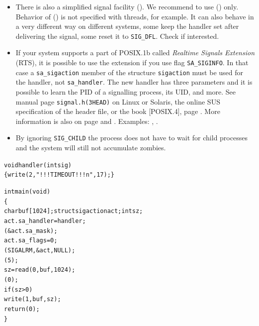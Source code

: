 \begin{itemize}
real delay.
Example: .
\item There is also a simplified signal facility ().  We recommend
to use () only.  Behavior of () is not specified
with threads, for example.  It can also behave in a very different way on
different systems, some keep the handler set after delivering the signal, some
reset it to \texttt{SIG\_DFL}.  Check  if
interested.
\item {} If your system supports a part of POSIX.1b
called \emph{Realtime Signals Extension} (RTS), it is possible to use the
extension if you use flag \texttt{SA\_SIGINFO}.  In that case a
\texttt{sa\_sigaction} member of the structure \texttt{sigaction} must be used
for the handler, not \texttt{sa\_handler}.  The new handler has three parameters
and it is possible to learn the PID of a signalling process, its UID, and more.
See manual page \texttt{signal.h(3HEAD)} on Linux or Solaris, the online SUS
specification of the header file, or the book [POSIX.4], page
\pageref{REF_PROGRAMMING}.  More information is also on page \pageref{POSIX} and
\pageref{SIGWAITINFO}.  Examples: ,
.
\item {} By ignoring \texttt{SIG\_CHILD} the process
does not have to wait for child processes and the system will still not
accumulate zombies.
\end{itemize}


\begin{slide}
\setlength{\baselineskip}{0.8\baselineskip}
\begin{alltt}
void handler(int sig)
\{ write(2," !!! TIMEOUT !!! \bs{}n", 17); \}

int main(void)
\{
    char buf[1024]; struct sigaction act; int sz;
    act.sa\_handler = handler;
    (&act.sa\_mask);
    act.sa\_flags = 0;
    (SIGALRM, &act, NULL);
    (5);
    sz = read(0, buf, 1024);
    (0);
    if (sz > 0)
        write(1, buf, sz);
    return (0);
\}
\end{alltt}
\end{slide}


